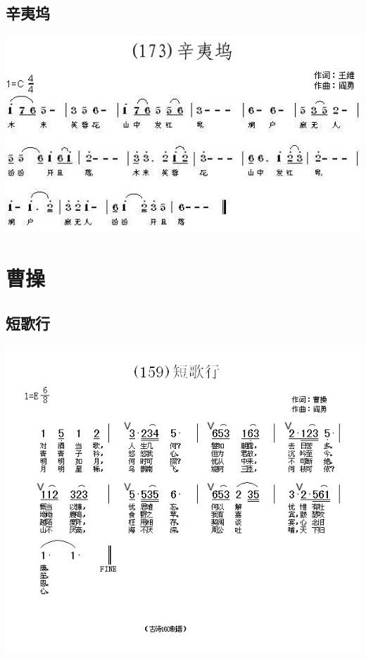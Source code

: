 \documentclass[cn,pad,chinesefont=nofont,twocol]{elegantbook}
\begin{document}
\section{辛夷坞}
    \includegraphics[width=\textwidth]{dongxiao/20200627-王维-辛夷坞.jpg} 

\chapter{曹操}
\section{短歌行}
    \includegraphics[width=\textwidth]{dongxiao/20200808-短歌行-曹操.jpg} 
\end{document}
